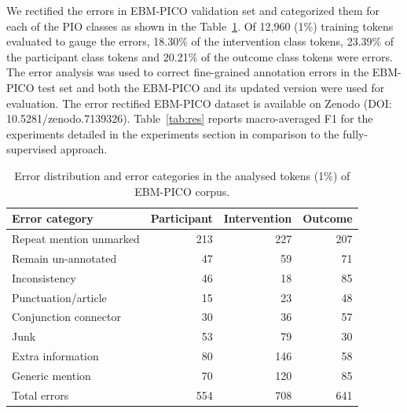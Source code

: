 \documentclass[10.7pt,]{article}
\begin{document}
%
We rectified the errors in EBM-PICO validation set and categorized them for each of the PIO classes as shown in the Table~\ref{tab:errordist}.
Of 12,960 (1\%) training tokens evaluated to gauge the errors, 18.30\% of the intervention class tokens, 23.39\% of the participant class tokens and 20.21\% of the outcome class tokens were errors.
The error analysis was used to correct fine-grained annotation errors in the EBM-PICO test set and both the EBM-PICO and its updated version were used for evaluation.
The error rectified EBM-PICO dataset is available on Zenodo (DOI: 10.5281/zenodo.7139326).
Table~\ref{tab:res} reports macro-averaged F1 for the experiments detailed in the experiments section in comparison to the fully-supervised approach.
%
\begin{table}[!ht]
    \centering
    \begin{tabular}{|l|r|r|r|}
    \hline
        Error category & Participant & Intervention & Outcome \\ \hline
        Repeat mention unmarked & 213 & 227 & 207 \\ 
        Remain un-annotated & 47 & 59 & 71 \\ 
        Inconsistency & 46 & 18 & 85 \\ 
        Punctuation/article & 15 & 23 & 48 \\ 
        Conjunction connector & 30 & 36 & 57 \\ 
        Junk & 53 & 79 & 30 \\ 
        Extra information & 80 & 146 & 58 \\ 
        Generic mention & 70 & 120 & 85 \\ \hline
        Total errors & 554 & 708 & 641 \\ \hline
    \end{tabular}
    \caption{\label{tab:errordist} Error distribution and error categories in the analysed tokens (1\%) of EBM-PICO corpus.}
\end{table}
%
\end{document}
